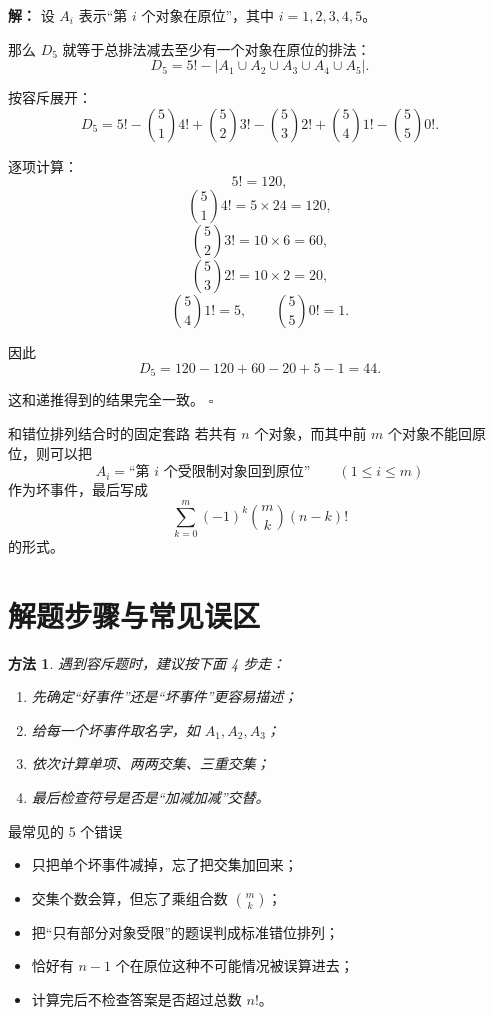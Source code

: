 \documentclass[11pt,a4paper,fontset=fandol]{ctexart}
\theoremstyle{formaltheorem}
\newtheorem{method}{方法}[section]
\theoremstyle{formalexample}
\newenvironment{solution}{\par\noindent\textbf{解：}}{\hfill$\square$\par}
\begin{document}
\begin{solution}
设 $A_i$ 表示“第 $i$ 个对象在原位”，其中 $i=1,2,3,4,5$。

那么 $D_5$ 就等于总排法减去至少有一个对象在原位的排法：
\[
D_5=5!-\left|A_1\cup A_2\cup A_3\cup A_4\cup A_5\right|.
\]

按容斥展开：
\[
D_5=5!-\binom51 4!+\binom52 3!-\binom53 2!+\binom54 1!-\binom55 0!.
\]

逐项计算：
\[
5!=120,
\]
\[
\binom51 4!=5\times 24=120,
\]
\[
\binom52 3!=10\times 6=60,
\]
\[
\binom53 2!=10\times 2=20,
\]
\[
\binom54 1!=5,
\qquad
\binom55 0!=1.
\]

因此
\[
D_5=120-120+60-20+5-1=44.
\]

这和递推得到的结果完全一致。
\end{solution}

\begin{skillbox}{和错位排列结合时的固定套路}
若共有 $n$ 个对象，而其中前 $m$ 个对象不能回原位，则可以把
\[
A_i=\text{“第 $i$ 个受限制对象回到原位”}
\qquad (1\le i\le m)
\]
作为坏事件，最后写成
\[
\sum_{k=0}^{m}(-1)^k\binom{m}{k}(n-k)!
\]
的形式。
\end{skillbox}

\section{解题步骤与常见误区}

\begin{method}
遇到容斥题时，建议按下面 4 步走：
\begin{enumerate}
  \item 先确定“好事件”还是“坏事件”更容易描述；
  \item 给每一个坏事件取名字，如 $A_1,A_2,A_3$；
  \item 依次计算单项、两两交集、三重交集；
  \item 最后检查符号是否是“加减加减”交替。
\end{enumerate}
\end{method}

\begin{notebox}{最常见的 5 个错误}
\begin{itemize}
  \item 只把单个坏事件减掉，忘了把交集加回来；
  \item 交集个数会算，但忘了乘组合数 $\binom{m}{k}$；
  \item 把“只有部分对象受限”的题误判成标准错位排列；
  \item 恰好有 $n-1$ 个在原位这种不可能情况被误算进去；
  \item 计算完后不检查答案是否超过总数 $n!$。
\end{itemize}
\end{notebox}
\end{document}
